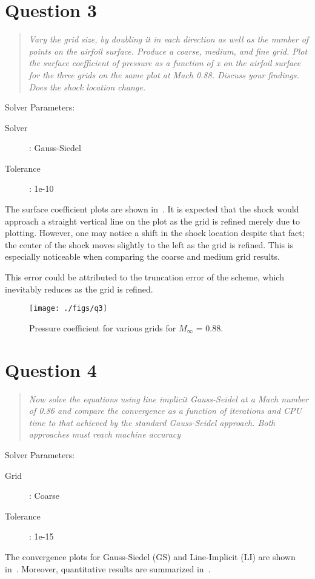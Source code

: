 \documentclass{SelimArticle}
\begin{document}
\section{Question 3}
\begin{quote}
    \textit{Vary the grid size, by doubling it in each direction as well as the number of points on
    the airfoil surface. Produce a coarse, medium, and fine grid. Plot the surface coefficient
of pressure as a function of x on the airfoil surface for the three grids on the same plot
at Mach 0.88. Discuss your findings. Does the shock location change.}
\end{quote}
Solver Parameters:
\begin{description}
    \item[Solver]: Gauss-Siedel
    \item[Tolerance]: 1e-10
\end{description}
The surface coefficient plots are shown in~. It is expected that the shock would
approach a straight vertical line on the plot as the grid is refined merely due to plotting.
However, one may notice a shift in the shock location despite that fact; the center of the
shock moves slightly to the left as the grid is refined. This is especially noticeable
when comparing the coarse and medium grid results.

This error could be attributed to the truncation error of the scheme, which inevitably reduces
as the grid is refined.

\begin{figure}
    \centering
    \texttt{[image: ./figs/q3]}
    \caption{Pressure coefficient for various grids for $M_\infty$ = 0.88.}\label{fig:q3}
\end{figure}

\newpage
\section{Question 4}
\begin{quote}
    \textit{Now solve the equations using line implicit Gauss-Seidel at a Mach number of 0.86 and
    compare the convergence as a function of iterations and CPU time to that achieved by
the standard Gauss-Seidel approach. Both approaches must reach machine accuracy}
\end{quote}
Solver Parameters:
\begin{description}
    \item[Grid]: Coarse
    \item[Tolerance]: 1e-15
\end{description}
The convergence plots for Gauss-Siedel (GS) and Line-Implicit (LI) are shown in~.
Moreover, quantitative results are summarized in~.
\end{document}
